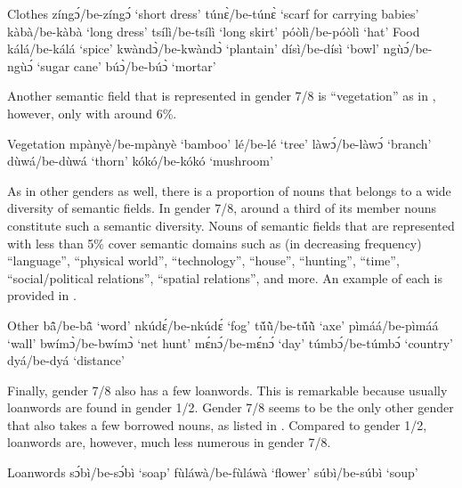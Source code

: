\ea\label{7/8cloth} Clothes
\ea zíngɔ́/be-zíngɔ́ `short dress'
\ex túnɛ̀/be-túnɛ̀ `scarf for carrying babies'
\ex kàbà/be-kàbà `long dress'
\ex tsílì/be-tsílì `long skirt'
\ex póòlì/be-póòlì `hat'
\z
\ex\label{7/8food} Food
\ea kálá/be-kálá `spice'
\ex kwàndɔ̀/be-kwàndɔ̀ `plantain'
\ex dísì/be-dísì `bowl'
\ex ngùɔ́/be-ngùɔ́ `sugar cane'
\ex búɔ̀/be-búɔ̀ `mortar'
\z
\z

\noindent Another semantic field that is represented in gender 7/8 is ``vegetation'' as in , however, only with around 6\%.

\ea\label{7/8vege} Vegetation
\ea mpànyè/be-mpànyè `bamboo'
\ex lé/be-lé `tree'
\ex làwɔ́/be-làwɔ́ `branch'
\ex dùwá/be-dùwá `thorn'
\ex kókó/be-kókó `mushroom'
\z
\z

\noindent As in other genders as well, there is a proportion of nouns that belongs to a wide diversity of semantic fields. In gender 7/8, around a third of its member nouns constitute such a semantic diversity. Nouns of semantic fields that are represented with less than 5\% cover semantic domains such as (in decreasing frequency) ``language'', ``physical world'', ``technology'', ``house'', ``hunting'', ``time'', ``social/political relations'', ``spatial relations'', and more. An example of each is provided in .

\ea\label{7/8other} Other
\ea bã̂/be-bã̂ `word'
\ex nkúdɛ́/be-nkúdɛ́ `fog'
\ex tṹũ̀/be-tṹũ̀ `axe'
\ex pìmáá/be-pìmáá `wall'
\ex bwímɔ̀/be-bwímɔ̀ `net hunt'
\ex mɛ́nɔ́/be-mɛ́nɔ́ `day'
\ex túmbɔ́/be-túmbɔ́ `country'
\ex dyá/be-dyá `distance'
\z
\z

\noindent Finally, gender 7/8 also has a few loanwords. This is remarkable because usually loanwords are found in gender 1/2. Gender 7/8 seems to be the only other gender that also takes a few borrowed nouns, as listed in . Compared to gender 1/2, loanwords are, however, much less numerous in gender 7/8.

\ea\label{7/8loan} Loanwords
\ea sɔ́bì/be-sɔ́bì `soap'
\ex fùláwà/be-fùláwà `flower'
\ex súbì/be-súbì `soup'
\z
\z

